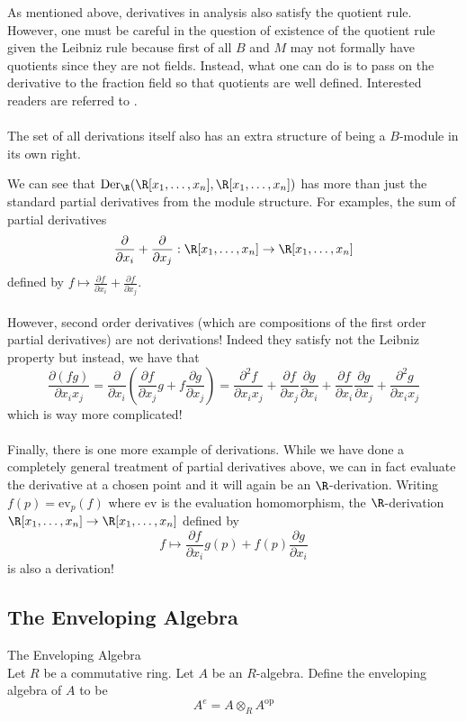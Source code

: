 \documentclass[a4paper]{article}
\begin{document}
As mentioned above, derivatives in analysis also satisfy the quotient rule. However, one must be careful in the question of existence of the quotient rule given the Leibniz rule because first of all $B$ and $M$ may not formally have quotients since they are not fields. Instead, what one can do is to pass on the derivative to the fraction field so that quotients are well defined. Interested readers are referred to \cite{Zar-Sam}. \\~\\

The set of all derivations itself also has an extra structure of being a $B$-module in its own right. 

We can see that $\text{Der}_\R(\R[x_1,\dots,x_n],\R[x_1,\dots,x_n])$ has more than just the standard partial derivatives from the module structure. For examples, the sum of partial derivatives $$\frac{\partial}{\partial x_i}+\frac{\partial}{\partial x_j}:\R[x_1,\dots,x_n]\to\R[x_1,\dots,x_n]$$ defined by $f\mapsto\frac{\partial f}{\partial x_i}+\frac{\partial f}{\partial x_j}$. \\~\\

However, second order derivatives (which are compositions of the first order partial derivatives) are not derivations! Indeed they satisfy not the Leibniz property but instead, we have that $$\frac{\partial (fg)}{\partial x_ix_j}=\frac{\partial}{\partial x_i}\left(\frac{\partial f}{\partial x_j}g+f\frac{\partial g}{\partial x_j}\right)=\frac{\partial^2 f}{\partial x_ix_j}+\frac{\partial f}{\partial x_j}\frac{\partial g}{\partial x_i}+\frac{\partial f}{\partial x_i}\frac{\partial g}{\partial x_j}+\frac{\partial^2g}{\partial x_ix_j}$$ which is way more complicated! \\~\\

Finally, there is one more example of derivations. While we have done a completely general treatment of partial derivatives above, we can in fact evaluate the derivative at a chosen point and it will again be an $\R$-derivation. Writing $f(p)=\text{ev}_p(f)$ where $\text{ev}$ is the evaluation homomorphism, the $\R$-derivation $\R[x_1,\dots,x_n]\to\R[x_1,\dots,x_n]$ defined by $$f\mapsto \frac{\partial f}{\partial x_i}g(p)+f(p)\frac{\partial g}{\partial x_i}$$ is also a derivation! 

\subsection{The Enveloping Algebra}
\begin{defn}{The Enveloping Algebra}{}\\
Let $R$ be a commutative ring. Let $A$ be an $R$-algebra. Define the enveloping algebra of $A$ to be $$A^e=A\otimes_RA^\text{op}$$
\end{defn}
\end{document}
